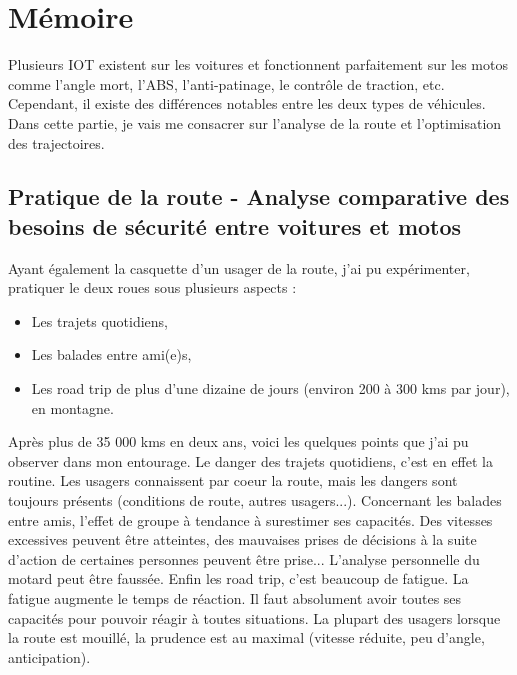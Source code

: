 \section{Mémoire}


Plusieurs IOT existent sur les voitures et fonctionnent parfaitement sur les motos comme l'angle mort, l'ABS, l'anti-patinage, le contrôle de traction, etc. Cependant, il existe des différences notables entre les deux types de véhicules. Dans cette partie, je vais me consacrer sur l'analyse de la route et l'optimisation des trajectoires.


\subsection{Pratique de la route - Analyse comparative des besoins de sécurité entre voitures et motos}



Ayant également la casquette d'un usager de la route, j'ai pu expérimenter, pratiquer le deux roues sous plusieurs aspects : \
\begin{itemize}
    \item Les trajets quotidiens,
    \item Les balades entre ami(e)s,
    \item Les road trip de plus d'une dizaine de jours (environ 200 à 300 kms par jour), en montagne.
\end{itemize}

Après plus de 35 000 kms en deux ans, voici les quelques points que j'ai pu observer dans mon entourage.
Le danger des trajets quotidiens, c'est en effet la routine. Les usagers connaissent par coeur la route, mais les dangers sont toujours présents (conditions de route, autres usagers...).
Concernant les balades entre amis, l'effet de groupe à tendance à surestimer ses capacités. Des vitesses excessives peuvent être atteintes, des mauvaises prises de décisions à la suite d'action de certaines personnes peuvent être prise... L'analyse personnelle du motard peut être faussée.
Enfin les road trip, c'est beaucoup de fatigue. La fatigue augmente le temps de réaction. Il faut absolument avoir toutes ses capacités pour pouvoir réagir à toutes situations.
La plupart des usagers lorsque la route est mouillé, la prudence est au maximal (vitesse réduite, peu d'angle, anticipation).

